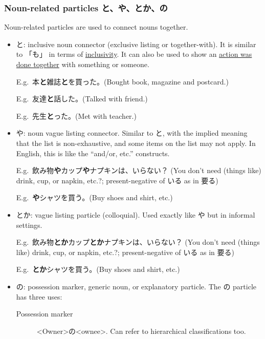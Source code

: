 \documentclass[../nihongo-gakushuu-kyouzai.tex]{subfiles}
\begin{document}
\subsubsection{Noun-related particles と、や、とか、の}\label{sec:noun-related-particles}
Noun-related particles are used to connect nouns together.
\begin{itemize}
    \item と: inclusive noun connector (exclusive listing or together-with).  It is similar to 「も」 in terms of \ul{inclusivity}. It can also be used to show an \ul{action was done together} with something or someone.

    E.g.\ 本\textbf{と}雑誌\textbf{と}を買った。(Bought book, magazine and postcard.)

    E.g.\ 友達\textbf{と}話した。(Talked with friend.)

    E.g.\ 先生\textbf{と}った。(Met with teacher.)
    \item や: noun vague listing connector. Similar to と,  with the implied meaning that the list is non-exhaustive, and some items on the list may not apply. In English, this is like the ``and/or, etc.'' constructs.

    E.g.\ 飲み物\textbf{や}カップ\textbf{や}ナプキンは、いらない？ (You don't need (things like) drink, cup, or napkin, etc.?; present-negative of いる as in 要る)

    E.g.\ \textbf{や}シャツを買う。(Buy shoes and shirt, etc.)
    \item とか: vague listing particle (colloquial). Used exactly like や but in informal settings. 

    E.g.\ 飲み物\textbf{とか}カップ\textbf{とか}ナプキンは、いらない？ (You don't need (things like) drink, cup, or napkin, etc.?; present-negative of いる as in 要る)

    E.g.\ \textbf{とか}シャツを買う。(Buy shoes and shirt, etc.)
    \item の: possession marker, generic noun, or explanatory particle. The の particle has three uses:
    \begin{description}
        \item[Possession marker] <Owner>の<ownee>. Can refer to hierarchical classifications too.


\end{description}
\end{itemize}
\end{document}
